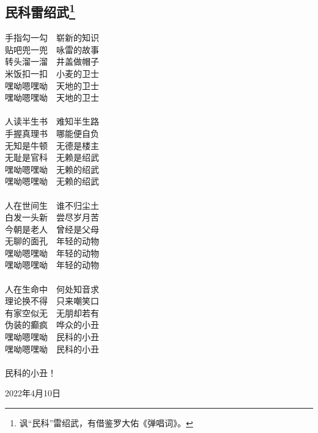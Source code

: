 \documentclass[a5paper]{ctexart}
\begin{document}
	\subsection[民科雷绍武]{民科雷绍武\footnote{讽“民科”雷绍武，有借鉴罗大佑《弹唱词》。}}
	\begin{center}
		手指勾一勾\ \ 崭新的知识\\
		贴吧兜一兜\ \ 咏雷的故事\\
		转头溜一溜\ \ 井盖做帽子\\
		米饭扣一扣\ \ 小麦的卫士\\
		嘿呦嗯嘿呦\ \ 天地的卫士\\
		嘿呦嗯嘿呦\ \ 天地的卫士\\ \hspace*{\fill} \\
		
		人读半生书\ \ 难知半生路\\
		手握真理书\ \ 哪能便自负\\
		无知是牛顿\ \ 无德是楼主\\
		无耻是官科\ \ 无赖是绍武\\
		嘿呦嗯嘿呦\ \ 无赖的绍武\\
		嘿呦嗯嘿呦\ \ 无赖的绍武\\ \hspace*{\fill} \\
		
		人在世间生\ \ 谁不归尘土\\
		白发一头新\ \ 尝尽岁月苦\\
		今朝是老人\ \ 曾经是父母\\
		无聊的面孔\ \ 年轻的动物\\
		嘿呦嗯嘿呦\ \ 年轻的动物\\
		嘿呦嗯嘿呦\ \ 年轻的动物\\ \hspace*{\fill} \\
		
		人在生命中\ \ 何处知音求\\
		理论换不得\ \ 只来嘲笑口\\
		有家空似无\ \ 无朋却若有\\
		伪装的癫疯\ \ 哗众的小丑\\
		嘿呦嗯嘿呦\ \ 民科的小丑\\
		嘿呦嗯嘿呦\ \ 民科的小丑\\ \hspace*{\fill} \\
		民科的小丑！
	\end{center}
	\hfill 2022年4月10日
	
\end{document}
